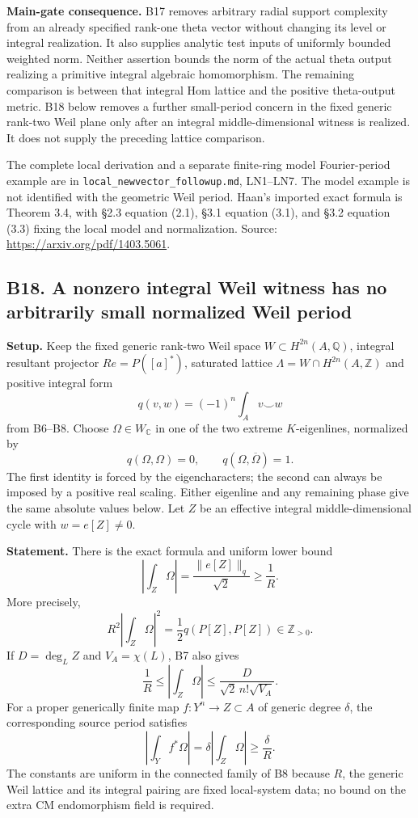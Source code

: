 \documentclass[11pt,a4paper]{article}
\theoremstyle{definition}
\begin{document}
\textbf{Main-gate consequence.} B17 removes arbitrary radial support complexity from an already specified rank-one theta vector without changing its level or integral realization. It also supplies analytic test inputs of uniformly bounded weighted norm. Neither assertion bounds the norm of the actual theta output realizing a primitive integral algebraic homomorphism. The remaining comparison is between that integral Hom lattice and the positive theta-output metric. B18 below removes a further small-period concern in the fixed generic rank-two Weil plane only after an integral middle-dimensional witness is realized. It does not supply the preceding lattice comparison.

The complete local derivation and a separate finite-ring model Fourier-period example are in \texttt{local\_newvector\_followup.md}, LN1--LN7. The model example is not identified with the geometric Weil period. Haan's imported exact formula is Theorem 3.4, with §2.3 equation (2.1), §3.1 equation (3.1), and §3.2 equation (3.3) fixing the local model and normalization. Source: \url{https://arxiv.org/pdf/1403.5061}.

\subsection{B18. A nonzero integral Weil witness has no arbitrarily small normalized Weil period}\label{b18.-a-nonzero-integral-weil-witness-has-no-arbitrarily-small-normalized-weil-period}

\textbf{Setup.} Keep the fixed generic rank-two Weil space \(W\subset H^{2n}(A,\mathbb Q)\), integral resultant projector \(Re=P([a]^*)\), saturated lattice \(\Lambda=W\cap H^{2n}(A,\mathbb Z)\) and positive integral form \[
 q(v,w)=(-1)^n\int_Av\smile w
\] from B6--B8. Choose \(\Omega\in W_\mathbb C\) in one of the two extreme \(K\)-eigenlines, normalized by \[
 q(\Omega,\Omega)=0,\qquad q(\Omega,\overline\Omega)=1.
\tag{B18.1}
\] The first identity is forced by the eigencharacters; the second can always be imposed by a positive real scaling. Either eigenline and any remaining phase give the same absolute values below. Let \(Z\) be an effective integral middle-dimensional cycle with \(w=e[Z]\ne0\).

\textbf{Statement.} There is the exact formula and uniform lower bound \[
 \left|\int_Z\Omega\right|
 =\frac{\|e[Z]\|_q}{\sqrt2}
 \ge\frac1R.
\tag{B18.2}
\] More precisely, \[
 R^2\left|\int_Z\Omega\right|^2
      =\frac12q(P[Z],P[Z])\in\mathbb Z_{>0}.
\tag{B18.3}
\] If \(D=\deg_L Z\) and \(V_A=\chi(L)\), B7 also gives \[
 \frac1R
 \le\left|\int_Z\Omega\right|
 \le\frac{D}{\sqrt2\,n!\sqrt{V_A}}.
\tag{B18.4}
\] For a proper generically finite map \(f:Y^n\to Z\subset A\) of generic degree \(\delta\), the corresponding source period satisfies \[
 \left|\int_Yf^*\Omega\right|
 =\delta\left|\int_Z\Omega\right|
 \ge\frac{\delta}{R}.
\tag{B18.5}
\] The constants are uniform in the connected family of B8 because \(R\), the generic Weil lattice and its integral pairing are fixed local-system data; no bound on the extra CM endomorphism field is required.
\end{document}
